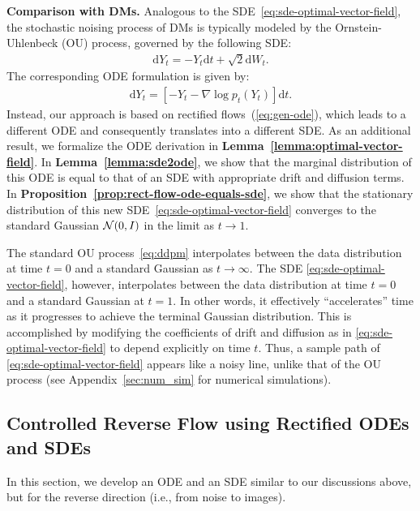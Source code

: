 \documentclass{article} %
\theoremstyle{plain}
\newcommand{\deriv}{\mathrm{d}}
\begin{document}
\noindent\textbf{Comparison with DMs.} 
Analogous to the SDE~\eqref{eq:sde-optimal-vector-field}, the stochastic noising process of DMs is typically modeled by the Ornstein-Uhlenbeck (OU) process, governed by the following SDE:
\begin{align}
    \label{eq:ddpm}
    \deriv Y_t = -Y_t \deriv t + \sqrt{2} \deriv W_t.
\end{align}
The corresponding ODE formulation is given by:
\begin{align}
    \label{eq:ddim}
    \deriv Y_t = \left[-Y_t - \nabla \log p_t(Y_t)\right] \deriv t .
\end{align}
Instead, our approach is based on rectified flows~(\ref{eq:gen-ode}), which leads to a different ODE and consequently translates into a different SDE. 
As an additional result, we formalize the ODE derivation in \textbf{Lemma~\ref{lemma:optimal-vector-field}}.
In \textbf{Lemma~\ref{lemma:sde2ode}}, we show that the marginal distribution of this ODE is equal to that of an SDE with appropriate drift and diffusion terms.
In \textbf{Proposition~\ref{prop:rect-flow-ode-equals-sde}}, we show that the stationary distribution of this new   SDE~\eqref{eq:sde-optimal-vector-field} converges to the standard Gaussian ${\mathcal{N}}(0,I)$ in the limit as $t\rightarrow 1$.


The standard OU process~\eqref{eq:ddpm} interpolates between the data distribution at time $t=0$ and a standard Gaussian as $t \to \infty$. The SDE \eqref{eq:sde-optimal-vector-field}, however, interpolates between the data distribution at time $t=0$ and a standard Gaussian at $t = 1$. In other words, it effectively ``accelerates'' time as it progresses to achieve the terminal Gaussian distribution. This is accomplished by modifying the coefficients of drift and diffusion as in \eqref{eq:sde-optimal-vector-field} to depend explicitly on time $t$. Thus, a sample path of \eqref{eq:sde-optimal-vector-field} appears like a noisy line, unlike that of the OU process (see Appendix~\ref{sec:num_sim} for numerical simulations).


\vspace{-1ex}
\subsection{Controlled Reverse Flow using Rectified ODEs and SDEs}
\label{sec:controlled-reverse-ode-sde}
\vspace{-1ex}
In this section, we develop an ODE and an SDE similar to our discussions above, but for the reverse direction (i.e., from noise to images).
\end{document}
